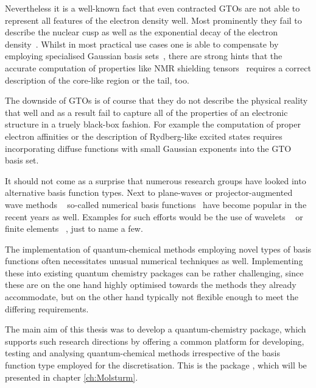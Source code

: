 Nevertheless it is a well-known fact
that even contracted GTOs are not able to represent
all features of the electron density well.
Most prominently they fail to describe the nuclear cusp as well as
the exponential decay of the electron density~\cite{Kato1957}.
Whilst in most practical use cases one is able to compensate
by employing specialised Gaussian basis sets~\cite{Jensen2013,Hill2013},
there are strong hints that the accurate computation of properties
like NMR shielding tensors~\cite{Guell2008,Hoggan2009}
requires a correct description of the core-like region or the tail, too.

The downside of GTOs is of course that they do not describe the physical
reality that well and as a result fail to capture all of the properties
of an electronic structure in a truely black-box fashion.
For example the computation of proper electron affinities or the description
of Rydberg-like excited states requires incorporating diffuse functions
with small Gaussian exponents into the GTO basis set.

It should not come as a surprise that numerous research groups
have looked into alternative basis function types.
Next to plane-waves or projector-augmented wave methods%
~\cite{Kresse1996,Kresse1999,Mortensen2005,Enkovaara2010}
so-called numerical basis functions~\cite{Frediani2015}
have become popular in the recent years as well.
Examples for such efforts would be the use of wavelets%
~\cite{Bischoff2011,Bischoff2012,Bischoff2013,Bischoff2014,Bischoff2014a,Bischoff2017}
or finite elements%
~\cite{Tsuchida1995,Soler2002,Lehtovaara2009,Alizadegan2010,Avery2011PhD,Davydov2015,Boffi2016},
just to name a few.

The implementation of quantum-chemical methods
employing novel types of basis functions often necessitates
unusual numerical techniques as well.
Implementing these into existing quantum chemistry packages
can be rather challenging,
since these are on the one hand highly optimised towards the methods
they already accommodate,
but on the other hand typically not flexible enough
to meet the differing requirements.

The main aim of this thesis was to develop a quantum-chemistry
package, which supports such research directions
by offering a common platform for developing, testing and analysing
quantum-chemical methods irrespective of the basis function type employed for
the discretisation.
This is the package \molsturm,
which will be presented in chapter \vref{ch:Molsturm}.

